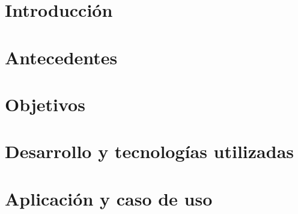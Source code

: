\documentclass[spanish,a4paper,12pt,oneside]{extreport}
\begin{document}
\newpage{\pagestyle{empty}}

\listoftables

\newpage{\pagestyle{empty}}

\renewcommand{\thepage}{\arabic{page}}
\setcounter{page}{1}


\chapter{Introducción}
\label{chapter:intro}




\chapter{Antecedentes}
\label{chapter:antecedentes}



\newpage{\pagestyle{empty}}
\thispagestyle{empty}

\chapter{Objetivos}
\label{chapter:objetivos}




\chapter{Desarrollo y tecnologías utilizadas}
\label{chapter:cuatro}



\newpage{\pagestyle{empty}}
\thispagestyle{empty}

\chapter{Aplicación y caso de uso}
\label{chapter:casodeuso}
\end{document}
